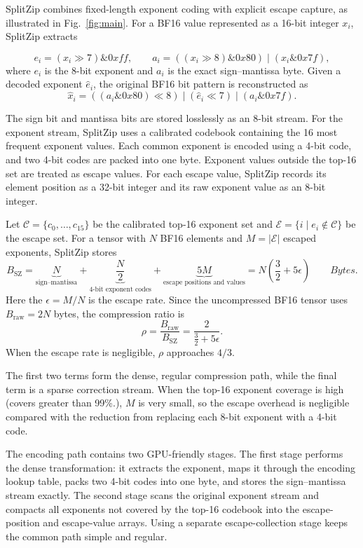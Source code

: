 SplitZip combines fixed-length exponent coding with explicit escape capture, as illustrated in Fig.~\ref{fig:main}. For a BF16 value represented as a 16-bit integer $x_i$, SplitZip extracts

\[
    e_i = (x_i \gg 7) \mathbin{\&} 0xff,
    \qquad
    a_i = ((x_i \gg 8) \mathbin{\&} 0x80) \;|\; (x_i \mathbin{\&} 0x7f),
\]
where $e_i$ is the 8-bit exponent and $a_i$ is the exact sign--mantissa byte.
Given a decoded exponent $\hat e_i$, the original BF16 bit pattern is reconstructed as
\[
    \hat x_i =
    ((a_i \mathbin{\&} 0x80) \ll 8)
    \;|\;
    (\hat e_i \ll 7)
    \;|\;
    (a_i \mathbin{\&} 0x7f).
\]

The sign bit and mantissa bits are stored losslessly as an 8-bit stream. 
For the exponent stream, SplitZip uses a calibrated codebook containing the 16 most frequent exponent values. 
Each common exponent is encoded using a 4-bit code, and two 4-bit codes are packed into one byte. 
Exponent values outside the top-16 set are treated as escape values. 
For each escape value, SplitZip records its element position as a 32-bit integer and its raw exponent value as an 8-bit integer.

Let $\mathcal{C}=\{c_0,\ldots,c_{15}\}$ be the calibrated top-16 exponent set and $\mathcal{E} = \{ i \mid e_i \notin \mathcal{C} \}$ be the escape set. 
For a tensor with $N$ BF16 elements and $M=|\mathcal{E}|$ escaped exponents, SplitZip stores
\[
    B_{\mathrm{SZ}}
    =
    \underbrace{N}_{\text{sign--mantissa}}
    +
    \underbrace{\frac{N}{2}}_{\text{4-bit exponent codes}}
    +
    \underbrace{5M}_{\text{escape positions and values}}
    =
    N\left(\frac{3}{2}+5\epsilon\right)
    \qquad Bytes.
\]
Here the $\epsilon=M/N$ is the escape rate. 
Since the uncompressed BF16 tensor uses $B_{\mathrm{raw}}=2N$ bytes, the compression ratio is
\[
    \rho
    =
    \frac{B_{\mathrm{raw}}}{B_{\mathrm{SZ}}}
    =
    \frac{2}{\frac{3}{2}+5\epsilon}.
\]
When the escape rate is negligible, $\rho$ approaches $4/3$.

The first two terms form the dense, regular compression path, while the final term is a sparse correction stream. 
When the top-16 exponent coverage is high (covers greater than 99\%.), $M$ is very small, so the escape overhead is negligible compared with the reduction from replacing each 8-bit exponent with a 4-bit code.

The encoding path contains two GPU-friendly stages. 
The first stage performs the dense transformation: it extracts the exponent, maps it through the encoding lookup table, packs two 4-bit codes into one byte, and stores the sign--mantissa stream exactly. 
The second stage scans the original exponent stream and compacts all exponents not covered by the top-16 codebook into the escape-position and escape-value arrays. 
Using a separate escape-collection stage keeps the common path simple and regular.

